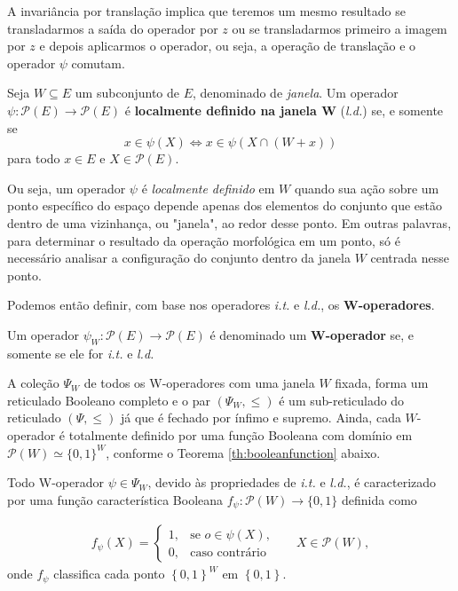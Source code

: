 A invariância por translação implica que teremos um mesmo resultado se transladarmos a saída do operador por $z$ ou se transladarmos primeiro a imagem por $z$ e depois aplicarmos o operador, ou seja, a operação de translação e o operador $\psi$ comutam.

\begin{definition} 
        Seja $W \subseteq E$ um subconjunto de $E$, denominado de \textit{janela}. Um operador  $\psi: \mathcal{P}\left(E\right) \rightarrow \mathcal{P}\left(E\right)$ é \textbf{localmente definido na janela W} (\textit{l.d.}) se, e somente se
        $$x \in \psi \left(X \right) \Longleftrightarrow x \in\psi \left( X \cap \left( W+x \right) \right)$$
        para todo $x \in E$ e $X \in \mathcal{P} \left( E \right)$.
        \label{def:ld}
\end{definition}

Ou seja, um operador $\psi$ é \textit{localmente definido} em $W$ quando sua ação sobre um ponto específico do espaço depende apenas dos elementos do conjunto que estão dentro de uma vizinhança, ou "janela", ao redor desse ponto. Em outras palavras, para determinar o resultado da operação morfológica em um ponto, só é necessário analisar a configuração do conjunto dentro da janela $W$ centrada nesse ponto.

Podemos então definir, com base nos operadores \textit{i.t.} e \textit{l.d.}, os \textbf{W-operadores}.

\begin{definition} 
        Um operador $\psi_{W}: \mathcal{P}\left(E\right) \rightarrow \mathcal{P}\left(E\right)$ é denominado um \textbf{W-operador} se, e somente se ele for \textit{i.t.} e \textit{l.d.}
\end{definition}

A coleção $\Psi_{W}$ de todos os W-operadores com uma janela $W$ fixada, forma um reticulado Booleano completo e o par $ \left( \Psi_{W}, \leq \right)$ é um sub-reticulado do reticulado  $ \left( \Psi, \leq \right)$ já que é fechado por ínfimo e supremo. Ainda, cada $W$-operador é totalmente definido por uma função Booleana com domínio em $\mathcal{P}(W) \simeq \{0,1\}^{W}$, conforme o Teorema \ref{th:booleanfunction} abaixo.

\begin{theorem}
    Todo W-operador $\psi \in \Psi_{W}$, devido às propriedades de \textit{i.t.} e \textit{l.d.},  é caracterizado por uma função característica Booleana $f_{\psi}: \mathcal{P}(W) \to \{0,1\}$ definida como

    \begin{align*}
        f_{\psi} \left( X \right) = \begin{cases}
        1, & \text{se $o \in \psi \left( X \right)$},\\
        0, & \text{caso contrário}
        \end{cases} & & X \in \mathcal{P}(W),
    \end{align*}
    onde $f_{\psi}$ classifica cada ponto $\left\{0,1 \right\}^{W}$ em $\left\{0,1 \right\}$.
    \label{th:booleanfunction}
\end{theorem}

